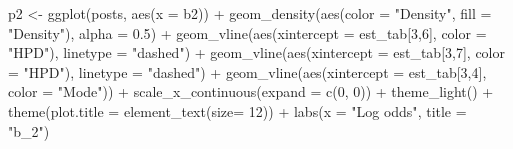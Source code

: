 \documentclass[12pt]{article}
\newenvironment{Shaded}{\begin{snugshade}}{\end{snugshade}}
\newcommand{\AttributeTok}[1]{\textcolor[rgb]{0.77,0.63,0.00}{#1}}
\newcommand{\DecValTok}[1]{\textcolor[rgb]{0.00,0.00,0.81}{#1}}
\newcommand{\FloatTok}[1]{\textcolor[rgb]{0.00,0.00,0.81}{#1}}
\newcommand{\FunctionTok}[1]{\textcolor[rgb]{0.00,0.00,0.00}{#1}}
\newcommand{\NormalTok}[1]{#1}
\newcommand{\OtherTok}[1]{\textcolor[rgb]{0.56,0.35,0.01}{#1}}
\newcommand{\SpecialCharTok}[1]{\textcolor[rgb]{0.00,0.00,0.00}{#1}}
\newcommand{\StringTok}[1]{\textcolor[rgb]{0.31,0.60,0.02}{#1}}
\begin{document}
\begin{Shaded}
\begin{Highlighting}[]
\NormalTok{p2 }\OtherTok{\textless{}{-}} \FunctionTok{ggplot}\NormalTok{(posts, }\FunctionTok{aes}\NormalTok{(}\AttributeTok{x =}\NormalTok{ b2)) }\SpecialCharTok{+}
  \FunctionTok{geom\_density}\NormalTok{(}\FunctionTok{aes}\NormalTok{(}\AttributeTok{color =} \StringTok{"Density"}\NormalTok{, }\AttributeTok{fill =} \StringTok{"Density"}\NormalTok{), }\AttributeTok{alpha =} \FloatTok{0.5}\NormalTok{) }\SpecialCharTok{+}
  \FunctionTok{geom\_vline}\NormalTok{(}\FunctionTok{aes}\NormalTok{(}\AttributeTok{xintercept =}\NormalTok{ est\_tab[}\DecValTok{3}\NormalTok{,}\DecValTok{6}\NormalTok{], }\AttributeTok{color =} \StringTok{"HPD"}\NormalTok{), }\AttributeTok{linetype =} \StringTok{"dashed"}\NormalTok{) }\SpecialCharTok{+}
  \FunctionTok{geom\_vline}\NormalTok{(}\FunctionTok{aes}\NormalTok{(}\AttributeTok{xintercept =}\NormalTok{ est\_tab[}\DecValTok{3}\NormalTok{,}\DecValTok{7}\NormalTok{], }\AttributeTok{color =} \StringTok{"HPD"}\NormalTok{), }\AttributeTok{linetype =} \StringTok{"dashed"}\NormalTok{) }\SpecialCharTok{+}
  \FunctionTok{geom\_vline}\NormalTok{(}\FunctionTok{aes}\NormalTok{(}\AttributeTok{xintercept =}\NormalTok{ est\_tab[}\DecValTok{3}\NormalTok{,}\DecValTok{4}\NormalTok{], }\AttributeTok{color =} \StringTok{"Mode"}\NormalTok{)) }\SpecialCharTok{+}
  \FunctionTok{scale\_x\_continuous}\NormalTok{(}\AttributeTok{expand =} \FunctionTok{c}\NormalTok{(}\DecValTok{0}\NormalTok{, }\DecValTok{0}\NormalTok{)) }\SpecialCharTok{+}
  \FunctionTok{theme\_light}\NormalTok{() }\SpecialCharTok{+}
  \FunctionTok{theme}\NormalTok{(}\AttributeTok{plot.title =} \FunctionTok{element\_text}\NormalTok{(}\AttributeTok{size=} \DecValTok{12}\NormalTok{)) }\SpecialCharTok{+} 
  \FunctionTok{labs}\NormalTok{(}\AttributeTok{x =} \StringTok{"Log odds"}\NormalTok{,}
       \AttributeTok{title =} \StringTok{"b\_2"}\NormalTok{)}


\end{Highlighting}
\end{Shaded}
\end{document}
